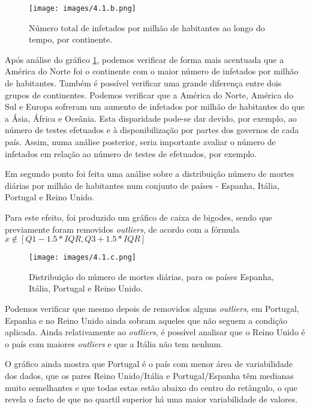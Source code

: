 \documentclass[conference]{IEEEtran}
\begin{document}
\begin{figure}[h]
    \centering
    \texttt{[image: images/4.1.b.png]}
    \caption{Número total de infetados por milhão de habitantes ao longo do tempo, por continente.}
    \label{fig:4.1.b}
\end{figure}

Após análise do gráfico \ref{fig:4.1.b}, podemos verificar de forma mais acentuada que a América do Norte foi o continente com o maior número de infetados por milhão de habitantes. Também é possível verificar uma grande diferença entre dois grupos de continentes. Podemos verificar que a América do Norte, América do Sul e Europa sofreram um aumento de infetados por milhão de habitantes do que a Ásia, África e Oceânia. Esta disparidade pode-se dar devido, por exemplo, ao número de testes efetuados e à disponibilização por partes dos governos de cada país. Assim, numa análise posterior, seria importante avaliar o número de infetados em relação ao número de testes de efetuados, por exemplo.

Em segundo ponto foi feita uma análise sobre a distribuição número de mortes diárias por milhão de habitantes num conjunto de países - Espanha, Itália, Portugal e Reino Unido.

Para este efeito, foi produzido um gráfico de caixa de bigodes, sendo que previamente foram removidos \textit{outliers}, de acordo com a fórmula $x \not\in [Q1 - 1.5 * IQR, Q3 + 1.5 * IQR]$

\begin{figure}[h]
    \centering
    \texttt{[image: images/4.1.c.png]}
    \caption{Distribuição do número de mortes diárias, para os países Espanha, Itália, Portugal e Reino Unido.}
    \label{fig:4.1.c}
\end{figure}

Podemos verificar que mesmo depois de removidos alguns \textit{outliers}, em Portugal, Espanha e no Reino Unido ainda sobram aqueles que não seguem a condição aplicada. Ainda relativamente ao \textit{outliers}, é possível analisar que o Reino Unido é o país com maiores \textit{outliers} e que a Itália não tem nenhum.

O gráfico ainda mostra que Portugal é o país com menor área de variabilidade dos dados, que os pares Reino Unido/Itália e Portugal/Espanha têm medianas muito semelhantes e que todas estas estão abaixo do centro do retângulo, o que revela o facto de que no quartil superior há uma maior variabilidade de valores.
\end{document}
